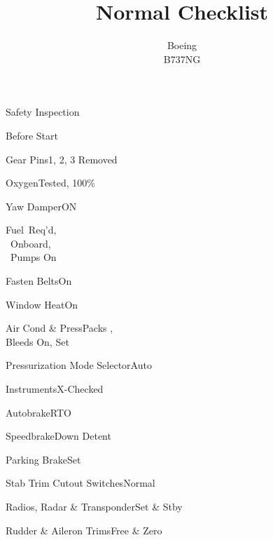 \documentclass[sim-use, blue_items, halfpage]{checklist}
\title{Normal Checklist}
\subtitle{Boeing \\ B737NG}
\begin{document}
 
\begin{checklist}{Safety Inspection}
\end{checklist}

\begin{checklist}{Before Start}
  \item{Gear Pins}{1, 2, 3 Removed}
  \item{Oxygen}{Tested, 100\%}
  \item{Yaw Damper}{ON}
  \item{Fuel}{\blank\ Req'd,\\\blank\ Onboard,\\\blank\ Pumps On}
  \item{Fasten Belts}{On}
  \item{Window Heat}{On}
  \item{Air Cond \& Press}{Packs \blank,\\Bleeds On, Set}
  \item{Pressurization Mode Selector}{Auto}
  \item{Instruments}{X-Checked}
  \item{Autobrake}{RTO}
  \item{Speedbrake}{Down Detent}
  \item{Parking Brake}{Set}
  \item{Stab Trim Cutout Switches}{Normal}
  \item{Radios, Radar \& Transponder}{Set \& Stby}
  \item{Rudder \& Aileron Trims}{Free \& Zero}
\end{checklist}
\end{document}
